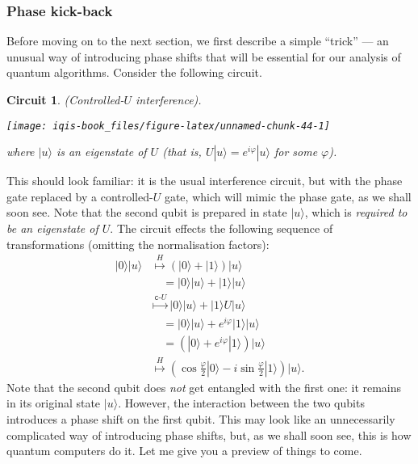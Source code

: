 \documentclass[fleqn]{article}
\newtheorem*{circuit}{Circuit}
\begin{document}
\hypertarget{phase-kick-back}{%
\subsubsection{Phase kick-back}\label{phase-kick-back}}

Before moving on to the next section, we first describe a simple ``trick'' --- an unusual way of introducing phase shifts that will be essential for our analysis of quantum algorithms.
Consider the following circuit.

\begin{circuit}

(Controlled-\(U\) interference).

\begin{center}\texttt{[image: iqis-book\_files/figure-latex/unnamed-chunk-44-1]} \end{center}

where \(|u\rangle\) is an \emph{eigenstate} of \(U\) (that is, \(U|u\rangle = e^{i\varphi}|u\rangle\) for some \(\varphi\)).


\end{circuit}

This should look familiar: it is the usual interference circuit, but with the phase gate replaced by a controlled-\(U\) gate, which will mimic the phase gate, as we shall soon see.
Note that the second qubit is prepared in state \(|u\rangle\), which is \emph{required to be an eigenstate of \(U\)}.
The circuit effects the following sequence of transformations (omitting the normalisation factors):
\[
  \begin{aligned}
    |0\rangle|u\rangle
    &\overset{H}{\longmapsto}
    (|0\rangle+|1\rangle)|u\rangle
  \\&\quad = |0\rangle|u\rangle + |1\rangle|u\rangle
  \\&\overset{\texttt{c-}U}{\longmapsto}
    |0\rangle|u\rangle + |1\rangle U|u\rangle
  \\&\quad = |0\rangle|u\rangle + e^{i\varphi}|1\rangle|u\rangle
  \\&\quad = (|0\rangle + e^{i\varphi}|1\rangle) |u\rangle
  \\&\overset{H}{\longmapsto}
    \left(
      \cos\frac{\varphi}{2}|0\rangle
      - i\sin\frac{\varphi}{2}|1\rangle
    \right) |u\rangle.
  \end{aligned}
\]
Note that the second qubit does \emph{not} get entangled with the first one: it remains in its original state \(|u\rangle\).
However, the interaction between the two qubits introduces a phase shift on the first qubit.
This may look like an unnecessarily complicated way of introducing phase shifts, but, as we shall soon see, this is how quantum computers do it.
Let me give you a preview of things to come.
\end{document}
